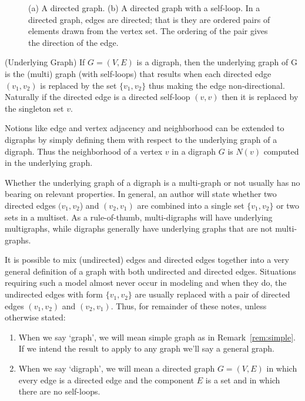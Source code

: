 %
\begin{figure}
\centering
\begin{subfigure}[b]{0.49\textwidth}
  \centering
  
  \caption{\label{fig:gr2-a}}%
\end{subfigure}
\begin{subfigure}[b]{0.49\textwidth}
  \centering
  
  \caption{\label{fig:gr2-b}}%
\end{subfigure}
\caption{
(a) A directed graph.
(b) A directed graph with a self-loop.
In a directed graph, edges are directed; that is they are ordered pairs of elements drawn from the vertex set.
The ordering of the pair gives the direction of the edge.
}
\end{figure}
%
\begin{definition}{(Underlying Graph)}
If \(G = (V,E)\) is a digraph, then the underlying graph of G is the (multi) graph (with self-loops) that results when each directed edge \((v_1, v_2)\) is replaced by the set \(\{v_1, v_2\}\) thus making the edge non-directional.
Naturally if the directed edge is a directed self-loop \((v, v)\) then it is replaced by the singleton set \({v}\).
\end{definition}
%
\begin{remark}
Notions like edge and vertex adjacency and neighborhood can be extended to digraphs by simply defining them with respect to the underlying graph of a digraph.
Thus the neighborhood of a vertex \(v\) in a digraph \(G\) is \(N(v)\) computed in the underlying graph.
\end{remark}
%
\begin{remark}
Whether the underlying graph of a digraph is a multi-graph or not usually has no bearing on relevant properties.
In general, an author will state whether two directed edges \((v_1, v_2\)) and \((v_2, v_1)\) are combined into a single set \(\{v_1, v_2\}\) or two sets in a multiset.
As a rule-of-thumb, multi-digraphs will have underlying multigraphs, while digraphs generally have underlying graphs that are not multi-graphs.
\end{remark}
%
\begin{remark}
It is possible to mix (undirected) edges and directed edges together into a very general definition of a graph with both undirected and directed edges.
Situations requiring such a model almost never occur in modeling and when they do, the undirected edges with form \(\{v_1, v_2\}\) are usually replaced with a pair of directed edges \((v_1, v_2)\) and \((v_2, v_1)\).
Thus, for remainder of these notes, unless otherwise stated:
\begin{enumerate}
\item When we say `graph', we will mean simple graph as in Remark~\ref{rem:simple}.
If we intend the result to apply to any graph we’ll say a general graph.
\item When we say `digraph', we will mean a directed graph \(G = (V, E)\) in which every edge is a directed edge and the component \(E\) is a set and in which there are no self-loops.
\end{enumerate}
\end{remark}
